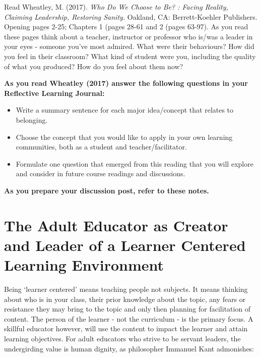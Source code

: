 \documentclass[
]{book}
\providecommand{\tightlist}{%
  \setlength{\itemsep}{0pt}\setlength{\parskip}{0pt}}
\begin{document}
\begin{reflect}
Read Wheatley, M. (2017). \emph{Who Do We Choose to Be? : Facing
Reality, Claiming Leadership, Restoring Sanity.} Oakland, CA:
Berrett-Koehler Publishers. Opening pages 2-25; Chapters 1 (pages 28-61
and 2 (pages 63-97). As you read these pages think about a teacher,
instructor or professor who is/was a leader in your eyes - someone
you've most admired. What were their behaviours? How did you feel in
their classroom? What kind of student were you, including the quality of
what you produced? How do you feel about them now?

\textbf{As you read Wheatley (2017) answer the following questions in
your Reflective Learning Journal:}

\begin{itemize}
\tightlist
\item
  Write a summary sentence for each major idea/concept that relates to
  belonging.\\
\item
  Choose the concept that you would like to apply in your own learning
  communities, both as a student and teacher/facilitator.\\
\item
  Formulate one question that emerged from this reading that you will
  explore and consider in future course readings and discussions.
\end{itemize}

\textbf{As you prepare your discussion post, refer to these notes.}
\end{reflect}

\hypertarget{the-adult-educator-as-creator-and-leader-of-a-learner-centered-learning-environment}{%
\section{The Adult Educator as Creator and Leader of a Learner Centered Learning Environment}\label{the-adult-educator-as-creator-and-leader-of-a-learner-centered-learning-environment}}

Being `learner centered' means teaching people not subjects. It means thinking about who is in your class, their prior knowledge about the topic, any fears or resistance they may bring to the topic and only then planning for facilitation of content. The person of the learner - not the curriculum - is the primary focus. A skillful educator however, will use the content to impact the learner and attain learning objectives. For adult educators who strive to be servant leaders, the undergirding value is human dignity, as philosopher Immanuel Kant admonishes:
\end{document}
